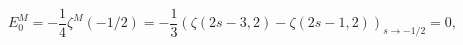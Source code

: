 \begin{equation}
E_0^M=-\frac 1 4 \zeta^M(-1/2)=
-\frac{1}{3}\left(\zeta(2s-3,2)-\zeta(2s-1,2)\right)_{s\rightarrow -1/2}=0,
\label{ein}
\end{equation}

